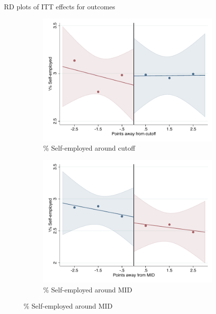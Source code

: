 \documentclass[notes,11pt, aspectratio=169]{beamer}
\begin{document}
\begin{frame}{RD plots of ITT effects for outcomes}
\hyperlink{ITT_rd_plot_IPN}{}
\begin{figure}

    \begin{subfigure}{0.45\textwidth}
        \centering
        \caption{\% Self-employed around cutoff}
        \includegraphics[width=\textwidth]{04_Figures/rd_plot_tau_Selfemployed_IPN3.pdf}
    \end{subfigure}
    \begin{subfigure}{0.45\textwidth}
        \centering
        \caption{\% Self-employed around MID}
        \includegraphics[width=\textwidth]{04_Figures/rd_plot_mid_Selfemployed_IPN3.pdf}
    \end{subfigure}
    
\end{figure}
\end{frame}
\end{document}
